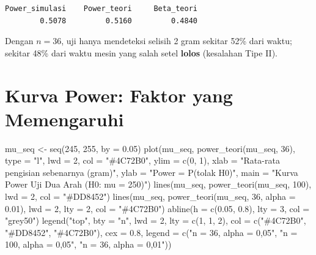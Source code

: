 \documentclass[
  indonesian,
  letterpaper,
]{book}
\newenvironment{Shaded}{\begin{snugshade}}{\end{snugshade}}
\newcommand{\AttributeTok}[1]{\textcolor[rgb]{0.40,0.45,0.13}{#1}}
\newcommand{\DecValTok}[1]{\textcolor[rgb]{0.68,0.00,0.00}{#1}}
\newcommand{\FloatTok}[1]{\textcolor[rgb]{0.68,0.00,0.00}{#1}}
\newcommand{\FunctionTok}[1]{\textcolor[rgb]{0.28,0.35,0.67}{#1}}
\newcommand{\NormalTok}[1]{\textcolor[rgb]{0.00,0.23,0.31}{#1}}
\newcommand{\OtherTok}[1]{\textcolor[rgb]{0.00,0.23,0.31}{#1}}
\newcommand{\StringTok}[1]{\textcolor[rgb]{0.13,0.47,0.30}{#1}}
\begin{document}
\begin{verbatim}
Power_simulasi    Power_teori     Beta_teori 
        0.5078         0.5160         0.4840 
\end{verbatim}

Dengan \(n = 36\), uji hanya mendeteksi selisih 2 gram sekitar 52\% dari
waktu; sekitar 48\% dari waktu mesin yang salah setel \textbf{lolos}
(kesalahan Tipe II).

\section{Kurva Power: Faktor yang
Memengaruhi}\label{kurva-power-faktor-yang-memengaruhi}

\begin{Shaded}
\begin{Highlighting}[]
\NormalTok{mu\_seq }\OtherTok{\textless{}{-}} \FunctionTok{seq}\NormalTok{(}\DecValTok{245}\NormalTok{, }\DecValTok{255}\NormalTok{, }\AttributeTok{by =} \FloatTok{0.05}\NormalTok{)}
\FunctionTok{plot}\NormalTok{(mu\_seq, }\FunctionTok{power\_teori}\NormalTok{(mu\_seq, }\DecValTok{36}\NormalTok{), }\AttributeTok{type =} \StringTok{"l"}\NormalTok{, }\AttributeTok{lwd =} \DecValTok{2}\NormalTok{, }\AttributeTok{col =} \StringTok{"\#4C72B0"}\NormalTok{, }\AttributeTok{ylim =} \FunctionTok{c}\NormalTok{(}\DecValTok{0}\NormalTok{, }\DecValTok{1}\NormalTok{),}
     \AttributeTok{xlab =} \StringTok{"Rata{-}rata pengisian sebenarnya (gram)"}\NormalTok{, }\AttributeTok{ylab =} \StringTok{"Power = P(tolak H0)"}\NormalTok{,}
     \AttributeTok{main =} \StringTok{"Kurva Power Uji Dua Arah (H0: mu = 250)"}\NormalTok{)}
\FunctionTok{lines}\NormalTok{(mu\_seq, }\FunctionTok{power\_teori}\NormalTok{(mu\_seq, }\DecValTok{100}\NormalTok{), }\AttributeTok{lwd =} \DecValTok{2}\NormalTok{, }\AttributeTok{col =} \StringTok{"\#DD8452"}\NormalTok{)}
\FunctionTok{lines}\NormalTok{(mu\_seq, }\FunctionTok{power\_teori}\NormalTok{(mu\_seq, }\DecValTok{36}\NormalTok{, }\AttributeTok{alpha =} \FloatTok{0.01}\NormalTok{), }\AttributeTok{lwd =} \DecValTok{2}\NormalTok{, }\AttributeTok{lty =} \DecValTok{2}\NormalTok{, }\AttributeTok{col =} \StringTok{"\#4C72B0"}\NormalTok{)}
\FunctionTok{abline}\NormalTok{(}\AttributeTok{h =} \FunctionTok{c}\NormalTok{(}\FloatTok{0.05}\NormalTok{, }\FloatTok{0.8}\NormalTok{), }\AttributeTok{lty =} \DecValTok{3}\NormalTok{, }\AttributeTok{col =} \StringTok{"grey50"}\NormalTok{)}
\FunctionTok{legend}\NormalTok{(}\StringTok{"top"}\NormalTok{, }\AttributeTok{bty =} \StringTok{"n"}\NormalTok{, }\AttributeTok{lwd =} \DecValTok{2}\NormalTok{, }\AttributeTok{lty =} \FunctionTok{c}\NormalTok{(}\DecValTok{1}\NormalTok{, }\DecValTok{1}\NormalTok{, }\DecValTok{2}\NormalTok{), }\AttributeTok{col =} \FunctionTok{c}\NormalTok{(}\StringTok{"\#4C72B0"}\NormalTok{, }\StringTok{"\#DD8452"}\NormalTok{, }\StringTok{"\#4C72B0"}\NormalTok{), }\AttributeTok{cex =} \FloatTok{0.8}\NormalTok{,}
       \AttributeTok{legend =} \FunctionTok{c}\NormalTok{(}\StringTok{"n = 36, alpha = 0,05"}\NormalTok{, }\StringTok{"n = 100, alpha = 0,05"}\NormalTok{, }\StringTok{"n = 36, alpha = 0,01"}\NormalTok{))}
\end{Highlighting}
\end{Shaded}
\end{document}
